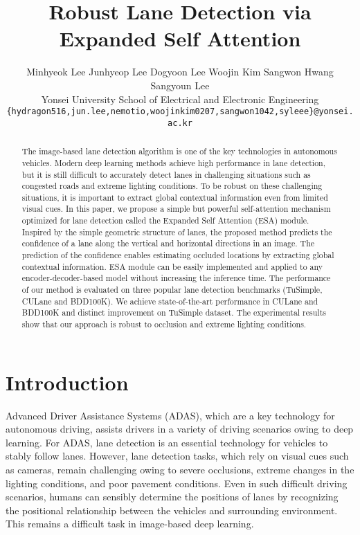 \documentclass[10pt,twocolumn,letterpaper]{article}
\begin{document}
\title{Robust Lane Detection via Expanded Self Attention}

\author{
	Minhyeok Lee \quad
	Junhyeop Lee \quad
	Dogyoon Lee \quad
	Woojin Kim \quad
	Sangwon Hwang \\
	Sangyoun Lee \quad
\vspace{0.01cm}\\
	Yonsei University School of Electrical and Electronic Engineering \\
	{\tt\small \{hydragon516,jun.lee,nemotio,woojinkim0207,sangwon1042,syleee\}@yonsei.ac.kr}
}

\maketitle

\ifwacvfinal
\thispagestyle{empty}
\fi

\begin{abstract}
   The image-based lane detection algorithm is one of the key technologies in autonomous vehicles. Modern deep learning methods achieve high performance in lane detection, but it is still difficult to accurately detect lanes in challenging situations such as congested roads and extreme lighting conditions. To be robust on these challenging situations, it is important to extract global contextual information even from limited visual cues. In this paper, we propose a simple but powerful self-attention mechanism optimized for lane detection called the Expanded Self Attention (ESA) module. Inspired by the simple geometric structure of lanes, the proposed method predicts the confidence of a lane along the vertical and horizontal directions in an image. The prediction of the confidence enables estimating occluded locations by extracting global contextual information. ESA module can be easily implemented and applied to any encoder-decoder-based model without increasing the inference time. The performance of our method is evaluated on three popular lane detection benchmarks (TuSimple, CULane and BDD100K). We achieve state-of-the-art performance in CULane and BDD100K and distinct improvement on TuSimple dataset. The experimental results show that our approach is robust to occlusion and extreme lighting conditions. 
\end{abstract}

\section{Introduction}
Advanced Driver Assistance Systems (ADAS), which are a key technology for autonomous driving, assists drivers in a variety of driving scenarios owing to deep learning. For ADAS, lane detection is an essential technology for vehicles to stably follow lanes. However, lane detection tasks, which rely on visual cues such as cameras, remain challenging owing to severe occlusions, extreme changes in the lighting conditions, and poor pavement conditions. Even in such difficult driving scenarios, humans can sensibly determine the positions of lanes by recognizing the positional relationship between the vehicles and surrounding environment. This remains a difficult task in image-based deep learning.
\end{document}
